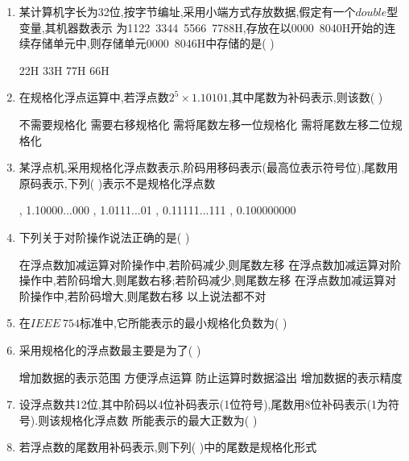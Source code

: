 \documentclass[12pt, a4paper, oneside, UTF8]{ctexbook}
\begin{document}
\begin{enumerate}
    \item 某计算机字长为32位,按字节编址,采用小端方式存放数据,假定有一个$double$型变量,其机器数表示
    为1122\ 3344\ 5566\ 7788H,存放在以0000\ 8040H开始的连续存储单元中,则存储单元0000\ 8046H中存储的是(   )
    \begin{choices}
        \task 22H 
        \task 33H 
        \task 77H 
        \task 66H 
    \end{choices}
    

    \item 在规格化浮点运算中,若浮点数$2^5\times1.10101$,其中尾数为补码表示,则该数(   ) 
    \begin{choices}[2]
        \task 不需要规格化
        \task 需要右移规格化
        \task 需将尾数左移一位规格化
        \task 需将尾数左移二位规格化
    \end{choices}


    \item 某浮点机,采用规格化浮点数表示,阶码用移码表示(最高位表示符号位),尾数用原码表示,下列(   )表示不是规格化浮点数 
    \begin{choices}[2]
        , 1.10000...000
        , 1.0111...01
        , 0.11111...111
        , 0.100000000 
    \end{choices}


    \item 下列关于对阶操作说法正确的是(   ) 
    \begin{choices}[1]
        \task 在浮点数加减运算对阶操作中,若阶码减少,则尾数左移
        \task 在浮点数加减运算对阶操作中,若阶码增大,则尾数右移;若阶码减少,则尾数左移
        \task 在浮点数加减运算对阶操作中,若阶码增大,则尾数右移
        \task 以上说法都不对
    \end{choices}


    \item 在$IEEE\ 754$标准中,它所能表示的最小规格化负数为(    )

    \item 采用规格化的浮点数最主要是为了(   ) 
    \begin{choices}[2]
        \task 增加数据的表示范围
        \task 方便浮点运算
        \task 防止运算时数据溢出
        \task 增加数据的表示精度 
    \end{choices}


    \item 设浮点数共12位,其中阶码以4位补码表示(1位符号),尾数用8位补码表示(1为符号).则该规格化浮点数
    所能表示的最大正数为(    ) 

    \item 若浮点数的尾数用补码表示,则下列(   )中的尾数是规格化形式 
    \begin{choices}
    \end{choices}
    


\end{enumerate}
\end{document}

